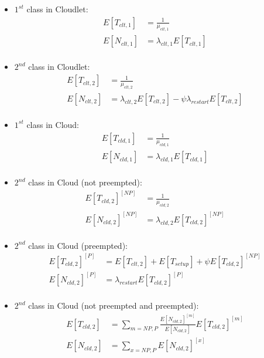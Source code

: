 \begin{itemize}
	\item $1^{st}$ class in Cloudlet:
	\begin{equation} 
	\begin{split}
	E[T_{clt,1}] &= \frac{1}{\mu_{clt,1}} \\
	E[N_{clt,1}] &= \lambda_{clt,1}E[T_{clt,1}] \\
	\end{split}
	\end{equation}

	\item $2^{nd}$ class in Cloudlet:
	\begin{equation} 
	\begin{split}
	E[T_{clt,2}] &= \frac{1}{\mu_{clt,2}} \\
	E[N_{clt,2}] &= \lambda_{clt,2}E[T_{clt,2}]-\psi\lambda_{restart}E[T_{clt,2}] \\
	\end{split}
	\end{equation}
	
	\item $1^{st}$ class in Cloud:
	\begin{equation} 
	\begin{split}
	E[T_{cld,1}] &= \frac{1}{\mu_{cld,1}} \\
	E[N_{cld,1}] &= \lambda_{cld,1}E[T_{cld,1}] \\
	\end{split}
	\end{equation}
	
	\item $2^{nd}$ class in Cloud (not preempted):
	\begin{equation} 
	\begin{split}
	E[T_{cld,2}]^{[NP]} &= \frac{1}{\mu_{cld,2}} \\
	E[N_{cld,2}]^{[NP]} &= \lambda_{cld,2}E[T_{cld,2}]^{[NP]} \\
	\end{split}
	\end{equation}
	
	\item $2^{nd}$ class in Cloud (preempted):
	\begin{equation} 
	\begin{split}
	E[T_{cld,2}]^{[P]} &= E[T_{clt,2}]+E[T_{setup}]+\psi E[T_{cld,2}]^{[NP]} \\
	E[N_{cld,2}]^{[P]} &= \lambda_{restart}E[T_{cld,2}]^{[P]} \\
	\end{split}
	\end{equation}
	
	\item $2^{nd}$ class in Cloud (not preempted and preempted):
	\begin{equation} 
	\begin{split}
	E[T_{cld,2}] &= \sum_{m=NP,P}\frac{E[N_{cld,2}]^{[m]}}{E[N_{cld,2}]}E[T_{cld,2}]^{[m]} \\
	E[N_{cld,2}] &= \sum_{x=NP,P}E[N_{cld,2}]^{[x]} \\
	\end{split}
	\end{equation}
\end{itemize}

